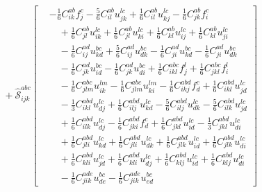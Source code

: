 \begin{align}
&\quad {}+ \widehat{\mathcal S}^{abc}_{ijk}\left[\begin{aligned}& -\frac{1}{6} C^{ab}_{ik} f^{c}_{j} - \frac{5}{6} C^{ab}_{il} u^{lc}_{jk} + \frac{1}{6} C^{ab}_{il} u^{lc}_{kj} - \frac{1}{6} C^{ab}_{jk} f^{c}_{i} \\ &\quad {}+ \frac{1}{6} C^{ab}_{jl} u^{lc}_{ik} + \frac{1}{6} C^{ab}_{jl} u^{lc}_{ki} + \frac{1}{6} C^{ab}_{kl} u^{lc}_{ij} + \frac{1}{6} C^{ab}_{kl} u^{lc}_{ji} \\ &\quad -\frac{1}{6} C^{ad}_{ij} u^{bc}_{kd} + \frac{5}{6} C^{ad}_{ij} u^{bc}_{dk} - \frac{1}{6} C^{ad}_{ji} u^{bc}_{kd} - \frac{1}{6} C^{ad}_{ji} u^{bc}_{dk} \\ &\quad -\frac{1}{6} C^{ad}_{jk} u^{bc}_{id} - \frac{1}{6} C^{ad}_{jk} u^{bc}_{di} + \frac{1}{6} C^{abc}_{ikl} f^{l}_{j} + \frac{1}{6} C^{abc}_{jkl} f^{l}_{i} \\ &\quad -\frac{1}{6} C^{abc}_{jlm} u^{lm}_{ik} - \frac{1}{6} C^{abc}_{jlm} u^{lm}_{ki} - \frac{1}{6} C^{abd}_{ikj} f^{c}_{d} + \frac{1}{6} C^{abd}_{ikl} u^{lc}_{jd} \\ &\quad -\frac{1}{3} C^{abd}_{ikl} u^{lc}_{dj} + \frac{1}{6} C^{abd}_{ilj} u^{lc}_{kd} - \frac{5}{6} C^{abd}_{ilj} u^{lc}_{dk} - \frac{5}{6} C^{abd}_{ilk} u^{lc}_{jd} \\ &\quad {}+ \frac{1}{6} C^{abd}_{ilk} u^{lc}_{dj} - \frac{1}{6} C^{abd}_{jki} f^{c}_{d} + \frac{1}{6} C^{abd}_{jkl} u^{lc}_{id} - \frac{1}{3} C^{abd}_{jkl} u^{lc}_{di} \\ &\quad {}+ \frac{1}{6} C^{abd}_{jli} u^{lc}_{kd} + \frac{1}{6} C^{abd}_{jli} u^{lc}_{dk} + \frac{1}{6} C^{abd}_{jlk} u^{lc}_{id} + \frac{1}{6} C^{abd}_{jlk} u^{lc}_{di} \\ &\quad {}+ \frac{1}{6} C^{abd}_{kli} u^{lc}_{jd} + \frac{1}{6} C^{abd}_{kli} u^{lc}_{dj} + \frac{1}{6} C^{abd}_{klj} u^{lc}_{id} + \frac{1}{6} C^{abd}_{klj} u^{lc}_{di} \\ &\quad -\frac{1}{6} C^{ade}_{jik} u^{bc}_{de} - \frac{1}{6} C^{ade}_{jik} u^{bc}_{ed}\end{aligned}\right]
\end{align}
